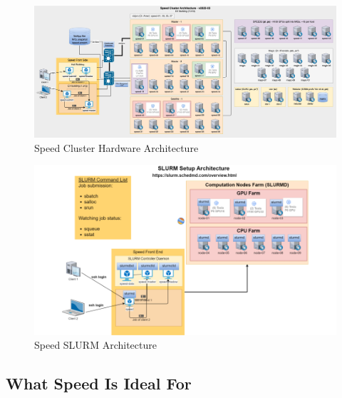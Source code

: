 \begin{figure}[htbp]
    \centering
    \includegraphics[width=\linewidth]{images/SpeedArchitecture-March_2025.jpg}
    \caption{Speed Cluster Hardware Architecture}
    \label{fig:speed-architecture}
\end{figure}

\begin{figure}[htpb]
	\centering
	\includegraphics[width=\columnwidth]{images/slurm-arch}
	\caption{Speed SLURM Architecture}
	\label{fig:slurm-arch}
\end{figure}

\subsection{What Speed Is Ideal For}
\label{sect:speed-is-for}

